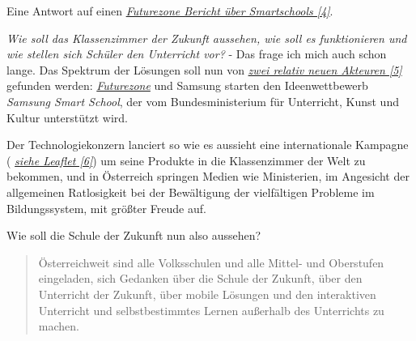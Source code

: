 Eine Antwort auf einen \href{http://futurezone.at/digital-life/ideenwettbewerb-einreichen-und-abstimmen/24.593.816}{\textit{Futurezone Bericht über Smartschools [4]}}.


\emph{Wie soll das Klassenzimmer der Zukunft aussehen, wie soll es funktionieren und wie stellen sich Schüler den Unterricht vor?} - Das frage ich mich auch schon lange. Das Spektrum der Lösungen soll nun von \href{http://futurezone.at/digitallife/14934-eboards-und-tablets-fuer-die-besten-ideen.php}{\textit{zwei relativ neuen Akteuren [5]}}  gefunden werden: \href{http://futurezone.at/}{\textit{Futurezone}} und Samsung starten den Ideenwettbewerb \emph{Samsung Smart School}, der vom Bundesministerium für Unterricht, Kunst und Kultur unterstützt wird.

Der Technologiekonzern lanciert so wie es aussieht eine internationale Kampagne ( \href{http://www.samsung.com/global/business/business-images/resource/RR-BC/2012/10/SamsungSmartSchoolLeaflet-0.pdf}{\textit{siehe Leaflet [6]}}) 
um seine Produkte in die Klassenzimmer der Welt zu bekommen, und in Österreich springen Medien wie Ministerien, im Angesicht der allgemeinen Ratlosigkeit bei der Bewältigung der vielfältigen Probleme im Bildungssystem, mit größter Freude auf.

Wie soll die Schule der Zukunft nun also aussehen?
\begin{quote}\glqq 
Österreichweit sind alle Volksschulen und alle Mittel- und Oberstufen eingeladen, sich Gedanken über die Schule der Zukunft, über den Unterricht der Zukunft, über mobile Lösungen und den interaktiven Unterricht und selbstbestimmtes Lernen außerhalb des Unterrichts zu machen.\grqq
\end{quote}

